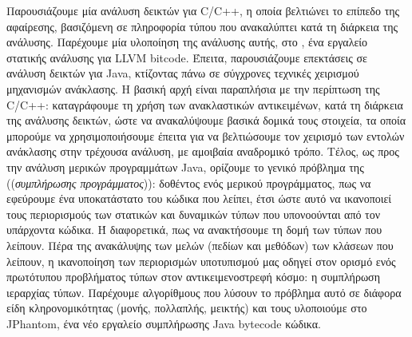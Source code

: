 Παρουσιάζουμε μία ανάλυση δεικτών για {\en C/C++}, η οποία βελτιώνει
το επίπεδο της αφαίρεσης, βασιζόμενη σε πληροφορία τύπου που
ανακαλύπτει κατά τη διάρκεια της ανάλυσης. Παρέχουμε μία υλοποίηση της
ανάλυσης αυτής, στο {\en \cclyzer{}}, ένα εργαλείο στατικής ανάλυσης
για {\en LLVM bitcode}.
%
Έπειτα, παρουσιάζουμε επεκτάσεις σε ανάλυση δεικτών για {\en Java},
κτίζοντας πάνω σε σύγχρονες τεχνικές χειρισμού μηχανισμών ανάκλασης. Η
βασική αρχή είναι παραπλήσια με την περίπτωση της {\en C/C++}:
καταγράφουμε τη χρήση των ανακλαστικών αντικειμένων, κατά τη διάρκεια
της ανάλυσης δεικτών, ώστε να ανακαλύψουμε βασικά δομικά τους
στοιχεία, τα οποία μπορούμε να χρησιμοποιήσουμε έπειτα για να
βελτιώσουμε τον χειρισμό των εντολών ανάκλασης στην τρέχουσα ανάλυση,
με αμοιβαία αναδρομικό τρόπο.
%
Τέλος, ως προς την ανάλυση μερικών προγραμμάτων {\en Java}, ορίζουμε
το γενικό πρόβλημα της ((\emph{συμπλήρωσης προγράμματος})): δοθέντος
ενός μερικού προγράμματος, πως να εφεύρουμε ένα υποκατάστατο του
κώδικα που λείπει, έτσι ώστε αυτό να ικανοποιεί τους περιορισμούς των
στατικών και δυναμικών τύπων που υπονοούνται από τον υπάρχοντα
κώδικα. Ή διαφορετικά, πως να ανακτήσουμε τη δομή των τύπων που
λείπουν. Πέρα της ανακάλυψης των μελών (πεδίων και μεθόδων) των
κλάσεων που λείπουν, η ικανοποίηση των περιορισμών υποτυπισμού μας
οδηγεί στον ορισμό ενός πρωτότυπου προβλήματος τύπων στον
αντικειμενοστρεφή κόσμο: η συμπλήρωση ιεραρχίας τύπων. Παρέχουμε
αλγορίθμους που λύσουν το πρόβλημα αυτό σε διάφορα είδη
κληρονομικότητας (μονής, πολλαπλής, μεικτής) και τους υλοποιούμε στο
{\en JPhantom}, ένα νέο εργαλείο συμπλήρωσης {\en Java bytecode}
κώδικα.

